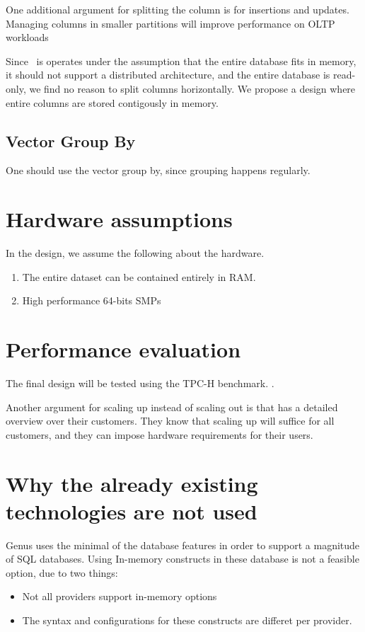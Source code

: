 One additional argument for splitting the column is for insertions and updates. Managing columns in smaller partitions will improve performance on OLTP workloads

Since \projectName~is operates under the assumption that the entire database fits in memory, it should not support a distributed architecture, and the entire database is read-only, we find no reason to split columns horizontally. We propose a design where entire columns are stored contigously in memory.

\subsection{Vector Group By}
\label{sub:Vector Group By}
One should use the vector group by, since grouping happens regularly.

\section{Hardware assumptions}
In the design, we assume the following about the hardware.
\begin{enumerate}
  \item The entire dataset can be contained entirely in RAM.
  \item High performance 64-bits SMPs
\end{enumerate}

\section{Performance evaluation}
\label{sec:Performance evaluation}
The final design will be tested using the TPC-H benchmark. .

Another argument for scaling up instead of scaling out is that \genus has a detailed overview over their customers. They know that scaling up will suffice for all customers, and they can impose hardware requirements for their users.







\section{Why the already existing technologies are not used}
\label{sec:Why the already existing technologies are not used}
Genus uses the minimal of the database features in order to support a magnitude of SQL databases. Using In-memory constructs in these database is not a feasible option, due to two things:
\begin{itemize}
  \item Not all providers support in-memory options
  \item The syntax and configurations for these constructs are differet per provider.
\end{itemize}

